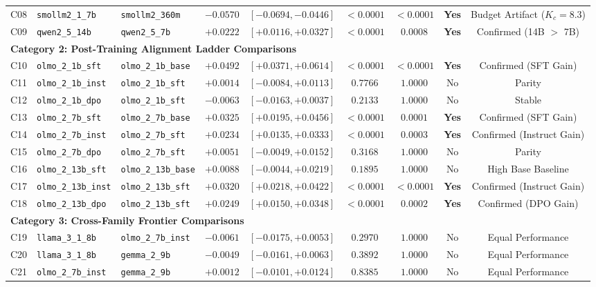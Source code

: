 \documentclass[11pt,a4paper]{article}
\begin{document}
\begin{table}[htbp]
\begin{adjustbox}{max width=\textwidth}
\begin{tabular}{c l l c c c c c c}
C08 & \texttt{smollm2\_1\_7b} & \texttt{smollm2\_360m} & $-0.0570$ & $[-0.0694, -0.0446]$ & $< 0.0001$ & $< 0.0001$ & \textbf{Yes} & Budget Artifact ($K_c=8.3$) \\
C09 & \texttt{qwen2\_5\_14b} & \texttt{qwen2\_5\_7b} & $+0.0222$ & $[+0.0116, +0.0327]$ & $< 0.0001$ & $0.0008$ & \textbf{Yes} & Confirmed (14B $>$ 7B) \\
\midrule
\multicolumn{9}{l}{\textbf{Category 2: Post-Training Alignment Ladder Comparisons}} \\
C10 & \texttt{olmo\_2\_1b\_sft} & \texttt{olmo\_2\_1b\_base} & $+0.0492$ & $[+0.0371, +0.0614]$ & $< 0.0001$ & $< 0.0001$ & \textbf{Yes} & Confirmed (SFT Gain) \\
C11 & \texttt{olmo\_2\_1b\_inst} & \texttt{olmo\_2\_1b\_sft} & $+0.0014$ & $[-0.0084, +0.0113]$ & $0.7766$ & $1.0000$ & No & Parity \\
C12 & \texttt{olmo\_2\_1b\_dpo} & \texttt{olmo\_2\_1b\_sft} & $-0.0063$ & $[-0.0163, +0.0037]$ & $0.2133$ & $1.0000$ & No & Stable \\
C13 & \texttt{olmo\_2\_7b\_sft} & \texttt{olmo\_2\_7b\_base} & $+0.0325$ & $[+0.0195, +0.0456]$ & $< 0.0001$ & $0.0001$ & \textbf{Yes} & Confirmed (SFT Gain) \\
C14 & \texttt{olmo\_2\_7b\_inst} & \texttt{olmo\_2\_7b\_sft} & $+0.0234$ & $[+0.0135, +0.0333]$ & $< 0.0001$ & $0.0003$ & \textbf{Yes} & Confirmed (Instruct Gain) \\
C15 & \texttt{olmo\_2\_7b\_dpo} & \texttt{olmo\_2\_7b\_sft} & $+0.0051$ & $[-0.0049, +0.0152]$ & $0.3168$ & $1.0000$ & No & Parity \\
C16 & \texttt{olmo\_2\_13b\_sft} & \texttt{olmo\_2\_13b\_base}& $+0.0088$ & $[-0.0044, +0.0219]$ & $0.1895$ & $1.0000$ & No & High Base Baseline \\
C17 & \texttt{olmo\_2\_13b\_inst}& \texttt{olmo\_2\_13b\_sft} & $+0.0320$ & $[+0.0218, +0.0422]$ & $< 0.0001$ & $< 0.0001$ & \textbf{Yes} & Confirmed (Instruct Gain) \\
C18 & \texttt{olmo\_2\_13b\_dpo} & \texttt{olmo\_2\_13b\_sft} & $+0.0249$ & $[+0.0150, +0.0348]$ & $< 0.0001$ & $0.0002$ & \textbf{Yes} & Confirmed (DPO Gain) \\
\midrule
\multicolumn{9}{l}{\textbf{Category 3: Cross-Family Frontier Comparisons}} \\
C19 & \texttt{llama\_3\_1\_8b} & \texttt{olmo\_2\_7b\_inst} & $-0.0061$ & $[-0.0175, +0.0053]$ & $0.2970$ & $1.0000$ & No & Equal Performance \\
C20 & \texttt{llama\_3\_1\_8b} & \texttt{gemma\_2\_9b} & $-0.0049$ & $[-0.0161, +0.0063]$ & $0.3892$ & $1.0000$ & No & Equal Performance \\
C21 & \texttt{olmo\_2\_7b\_inst} & \texttt{gemma\_2\_9b} & $+0.0012$ & $[-0.0101, +0.0124]$ & $0.8385$ & $1.0000$ & No & Equal Performance \\
\bottomrule
\end{tabular}
\end{adjustbox}
\end{table}
\end{document}
